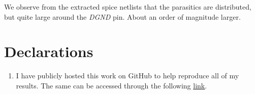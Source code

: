\documentclass[12pt,a4paper]{article}
\begin{document}
\noindent We observe from the extracted spice netlists that the parasitics are distributed, but quite large around the \emph{DGND} pin. About an order of magnitude larger.

\section{Declarations}
\begin{enumerate}
    \item I have publicly hosted this work on GitHub to help reproduce all of my results. The same can be accessed through the following \href{https://github.com/iamkarthikbk/ee5311-2025}{\underline{link}}.
\end{enumerate}
\end{document}

